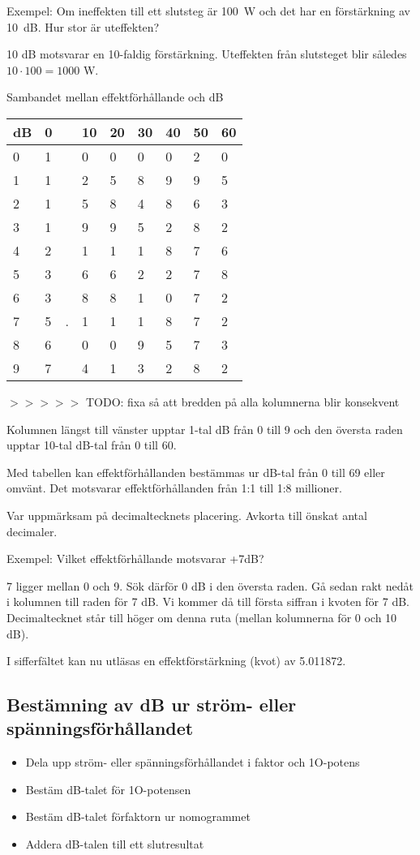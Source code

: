 Exempel: Om ineffekten till ett slutsteg är 100~W och det har en
förstärkning av 10~dB.  Hur stor är uteffekten?

10 dB motsvarar en 10-faldig förstärkning.  Uteffekten från slutsteget
blir således \(10 \cdot 100 = 1000\) W.

Sambandet mellan effektförhållande och dB

\begin{tabular}{l|llllllll}
  dB & 0 & & 10 & 20 & 30 & 40 & 50 & 60 \\
  \hline
  0  & 1 & & 0  & 0  & 0  & 0  & 2  & 0 \\
  1  & 1 & & 2  & 5  & 8  & 9  & 9  & 5 \\
  2  & 1 & & 5  & 8  & 4  & 8  & 6  & 3 \\
  3  & 1 & & 9  & 9  & 5  & 2  & 8  & 2 \\
  4  & 2 & & 1  & 1  & 1  & 8  & 7  & 6 \\
  5  & 3 & & 6  & 6  & 2  & 2  & 7  & 8 \\
  6  & 3 & & 8  & 8  & 1  & 0  & 7  & 2 \\
  7  & 5 &.& 1  & 1  & 1  & 8  & 7  & 2 \\
  8  & 6 & & 0  & 0  & 9  & 5  & 7  & 3 \\
  9  & 7 & & 4  & 1  & 3  & 2  & 8  & 2 \\
\end{tabular}
$>>>>>$ TODO: fixa så att bredden på alla kolumnerna blir konsekvent

Kolumnen längst till vänster upptar 1-tal dB från 0 till 9 och den
översta raden upptar 10-tal dB-tal från 0 till 60.

Med tabellen kan effektförhållanden bestämmas ur dB-tal från 0 till 69
eller omvänt.  Det motsvarar effektförhållanden från 1:1 till 1:8
millioner.

Var uppmärksam på decimaltecknets placering. Avkorta till önskat antal decimaler.

Exempel: Vilket effektförhållande motsvarar +7dB?

7 ligger mellan 0 och 9. Sök därför 0 dB i den översta raden. Gå sedan
rakt nedåt i kolumnen till raden för 7 dB. Vi kommer då till första
siffran i kvoten för 7 dB. Decimaltecknet står till höger om denna
ruta (mellan kolumnerna för 0 och 10 dB).

I sifferfältet kan nu utläsas en effektförstärkning (kvot) av
5.011872.

\subsection{Bestämning av dB ur ström- eller spänningsförhållandet}
\begin{itemize}
\item Dela upp ström- eller spänningsförhållandet i faktor och 1O-potens
\item Bestäm dB-talet för 1O-potensen
\item Bestäm dB-talet förfaktorn ur nomogrammet
\item Addera dB-talen till ett slutresultat
\end{itemize}

